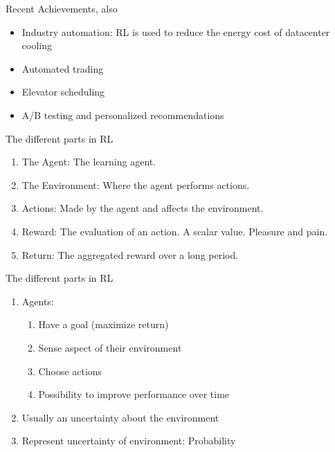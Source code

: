 \documentclass[10pt]{beamer}
\begin{document}
\begin{frame}{Recent Achievements, also }

\begin{itemize}
\item Industry automation: RL is used to reduce the energy cost of datacenter cooling\pause
\item Automated trading\pause
\item Elevator scheduling\pause
\item A/B testing and personalized recommendations
\end{itemize}

\end{frame}



\begin{frame}{The different parts in RL}

\begin{enumerate}
\item The {\color{uured} Agent}: The learning agent. \pause
\item The {\color{uured} Environment}: Where the agent performs actions.\pause
\item {\color{uured} Actions}: Made by the agent and affects the environment.\pause
\item {\color{uured} Reward}: The evaluation of an action. A scalar value. Pleasure and pain.\pause
\item {\color{uured} Return}: The aggregated reward over a long period.
\end{enumerate}

\end{frame}



\begin{frame}{The different parts in RL}

\begin{enumerate}
\item Agents:
\begin{enumerate}
\item Have a {\color{uured} goal} (maximize return)
\item {\color{uured} Sense} aspect of their environment
\item Choose {\color{uured} actions}
\item Possibility to {\color{uured} improve performance over time}
\end{enumerate}
\pause
\item Usually an {\color{uured} uncertainty} about the environment
\item Represent uncertainty of environment: {\color{uured} Probability}
\end{enumerate}

\end{frame}
\end{document}
